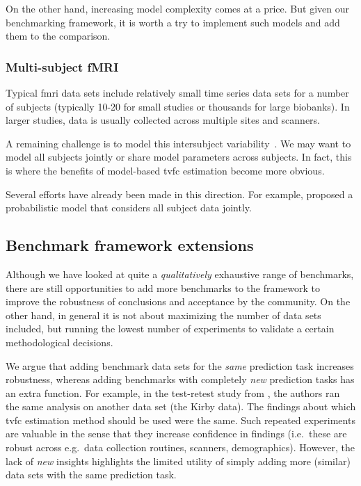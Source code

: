 On the other hand, increasing model complexity comes at a price.
But given our benchmarking framework, it is worth a try to implement such models and add them to the comparison.

\subsubsection{Multi-subject fMRI}

Typical \gls{fmri} data sets include relatively small time series data sets for a number of subjects (typically 10-20 for small studies or thousands for large biobanks).
In larger studies, data is usually collected across multiple sites and scanners.

A remaining challenge is to model this intersubject variability~\parencite{Allen2012}.
We may want to model all subjects jointly or share model parameters across subjects.
In fact, this is where the benefits of model-based \gls{tvfc} estimation become more obvious.

Several efforts have already been made in this direction.
For example, \textcite{Ebrahimi2020} proposed a probabilistic model that considers all subject data jointly.

\subsection{Benchmark framework extensions}
\label{subsec:benchmark-framework-extensions}

Although we have looked at quite a \emph{qualitatively} exhaustive range of benchmarks, there are still opportunities to add more benchmarks to the framework to improve the robustness of conclusions and acceptance by the community.
On the other hand, in general it is not about maximizing the number of data sets included, but running the lowest number of experiments to validate a certain methodological decisions.

We argue that adding benchmark data sets for the \emph{same} prediction task increases robustness, whereas adding benchmarks with completely \emph{new} prediction tasks has an extra function.
%
For example, in the test-retest study from \textcite{Choe2017}, the authors ran the same analysis on another data set (the Kirby data).
The findings about which \gls{tvfc} estimation method should be used were the same.
Such repeated experiments are valuable in the sense that they increase confidence in findings (i.e.~these are robust across e.g.~data collection routines, scanners, demographics).
However, the lack of \emph{new} insights highlights the limited utility of simply adding more (similar) data sets with the same prediction task.

